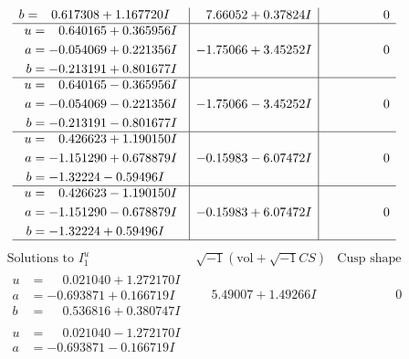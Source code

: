 \documentclass[1p]{elsarticle_modified}
\theoremstyle{definition}
\newcommand{\I}{\sqrt{-1}}
\begin{document}
$$\begin{array}{c|c|c}
\begin{aligned}
b &= \phantom{-}0.617308 + 1.167720 I\end{aligned}
 & \phantom{-}7.66052 + 0.37824 I & \phantom{-0.000000 } 0 \\ \hline\begin{aligned}
u &= \phantom{-}0.640165 + 0.365956 I \\
a &= -0.054069 + 0.221356 I \\
b &= -0.213191 + 0.801677 I\end{aligned}
 & -1.75066 + 3.45252 I & \phantom{-0.000000 } 0 \\ \hline\begin{aligned}
u &= \phantom{-}0.640165 - 0.365956 I \\
a &= -0.054069 - 0.221356 I \\
b &= -0.213191 - 0.801677 I\end{aligned}
 & -1.75066 - 3.45252 I & \phantom{-0.000000 } 0 \\ \hline\begin{aligned}
u &= \phantom{-}0.426623 + 1.190150 I \\
a &= -1.151290 + 0.678879 I \\
b &= -1.32224 - 0.59496 I\end{aligned}
 & -0.15983 - 6.07472 I & \phantom{-0.000000 } 0 \\ \hline\begin{aligned}
u &= \phantom{-}0.426623 - 1.190150 I \\
a &= -1.151290 - 0.678879 I \\
b &= -1.32224 + 0.59496 I\end{aligned}
 & -0.15983 + 6.07472 I & \phantom{-0.000000 } 0\\
 \hline 
 \end{array}$$\newpage$$\begin{array}{c|c|c}  
\text{Solutions to }I^u_{1}& \I (\text{vol} + \sqrt{-1}CS) & \text{Cusp shape}\\
 \hline 
\begin{aligned}
u &= \phantom{-}0.021040 + 1.272170 I \\
a &= -0.693871 + 0.166719 I \\
b &= \phantom{-}0.536816 + 0.380747 I\end{aligned}
 & \phantom{-}5.49007 + 1.49266 I & \phantom{-0.000000 } 0 \\ \hline\begin{aligned}
u &= \phantom{-}0.021040 - 1.272170 I \\
a &= -0.693871 - 0.166719 I \\

\end{aligned}
\end{array}$$
\end{document}
